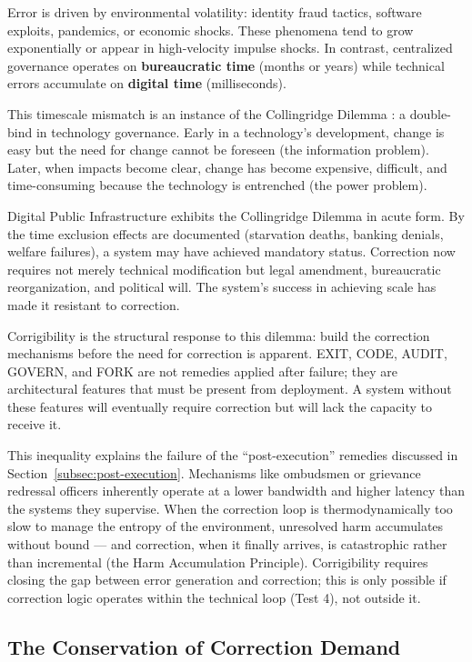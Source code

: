 \documentclass{article}
\begin{document}
Error is driven by environmental volatility: identity fraud tactics, software exploits, pandemics, or economic shocks. These phenomena tend to grow exponentially or appear in high-velocity impulse shocks. In contrast, centralized governance operates on \textbf{bureaucratic time} (months or years) while technical errors accumulate on \textbf{digital time} (milliseconds).

This timescale mismatch is an instance of the Collingridge Dilemma \citep{collingridge1980}: a double-bind in technology governance. Early in a technology's development, change is easy but the need for change cannot be foreseen (the information problem). Later, when impacts become clear, change has become expensive, difficult, and time-consuming because the technology is entrenched (the power problem).

Digital Public Infrastructure exhibits the Collingridge Dilemma in acute form. By the time exclusion effects are documented (starvation deaths, banking denials, welfare failures), a system may have achieved mandatory status. Correction now requires not merely technical modification but legal amendment, bureaucratic reorganization, and political will. The system's success in achieving scale has made it resistant to correction.

Corrigibility is the structural response to this dilemma: build the correction mechanisms before the need for correction is apparent. EXIT, CODE, AUDIT, GOVERN, and FORK are not remedies applied after failure; they are architectural features that must be present from deployment. A system without these features will eventually require correction but will lack the capacity to receive it.

This inequality explains the failure of the ``post-execution'' remedies discussed in Section~\ref{subsec:post-execution}. Mechanisms like ombudsmen or grievance redressal officers inherently operate at a lower bandwidth and higher latency than the systems they supervise. When the correction loop is thermodynamically too slow to manage the entropy of the environment, unresolved harm accumulates without bound --- and correction, when it finally arrives, is catastrophic rather than incremental (the Harm Accumulation Principle). Corrigibility requires closing the gap between error generation and correction; this is only possible if correction logic operates within the technical loop (Test 4), not outside it.

\subsection{The Conservation of Correction Demand}
\end{document}
